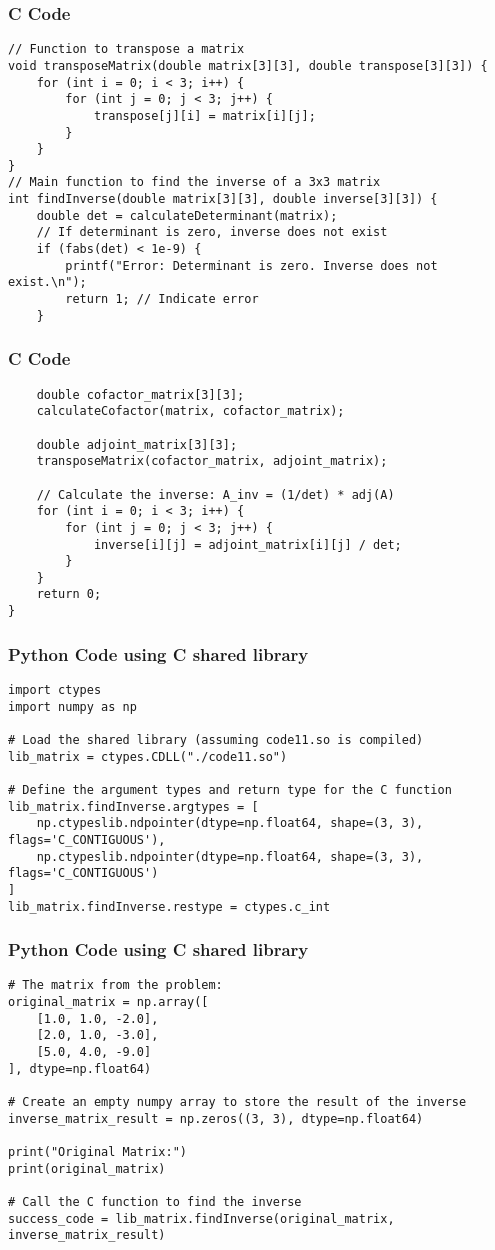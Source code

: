 \documentclass{beamer}
\begin{document}
\begin{frame}[fragile]
\frametitle{C Code}
\begin{lstlisting} 
// Function to transpose a matrix
void transposeMatrix(double matrix[3][3], double transpose[3][3]) {
    for (int i = 0; i < 3; i++) {
        for (int j = 0; j < 3; j++) {
            transpose[j][i] = matrix[i][j];
        }
    }
}
// Main function to find the inverse of a 3x3 matrix
int findInverse(double matrix[3][3], double inverse[3][3]) {
    double det = calculateDeterminant(matrix);
    // If determinant is zero, inverse does not exist
    if (fabs(det) < 1e-9) {
        printf("Error: Determinant is zero. Inverse does not exist.\n");
        return 1; // Indicate error
    }
\end{lstlisting}
\end{frame}

\begin{frame}[fragile]
\frametitle{C Code}
\begin{lstlisting} 
    double cofactor_matrix[3][3];
    calculateCofactor(matrix, cofactor_matrix);

    double adjoint_matrix[3][3];
    transposeMatrix(cofactor_matrix, adjoint_matrix);

    // Calculate the inverse: A_inv = (1/det) * adj(A)
    for (int i = 0; i < 3; i++) {
        for (int j = 0; j < 3; j++) {
            inverse[i][j] = adjoint_matrix[i][j] / det;
        }
    }
    return 0; 
}
\end{lstlisting}
\end{frame}

\begin{frame}[fragile]
\frametitle{Python Code using C shared library}
\begin{lstlisting}
import ctypes
import numpy as np

# Load the shared library (assuming code11.so is compiled)
lib_matrix = ctypes.CDLL("./code11.so")

# Define the argument types and return type for the C function
lib_matrix.findInverse.argtypes = [
    np.ctypeslib.ndpointer(dtype=np.float64, shape=(3, 3), flags='C_CONTIGUOUS'),
    np.ctypeslib.ndpointer(dtype=np.float64, shape=(3, 3), flags='C_CONTIGUOUS')
]
lib_matrix.findInverse.restype = ctypes.c_int
\end{lstlisting}
\end{frame}

\begin{frame}[fragile]
\frametitle{Python Code using C shared library}
\begin{lstlisting}
# The matrix from the problem:
original_matrix = np.array([
    [1.0, 1.0, -2.0],
    [2.0, 1.0, -3.0],
    [5.0, 4.0, -9.0]
], dtype=np.float64)

# Create an empty numpy array to store the result of the inverse
inverse_matrix_result = np.zeros((3, 3), dtype=np.float64)

print("Original Matrix:")
print(original_matrix)

# Call the C function to find the inverse
success_code = lib_matrix.findInverse(original_matrix, inverse_matrix_result)
\end{lstlisting}
\end{frame}
\end{document}
